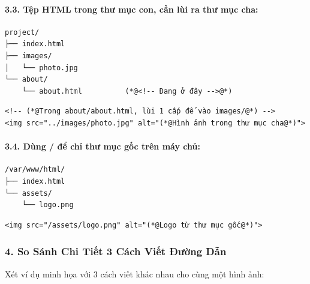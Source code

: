 \documentclass[11pt,oneside]{book}
\begin{document}
\paragraph{3.3. Tệp HTML trong thư mục con, cần lùi ra thư mục cha:}

\begin{codeWindow}
\begin{lstlisting}[language=HTML5]
project/
├── index.html
├── images/
│   └── photo.jpg
└── about/
    └── about.html          (*@<!-- Đang ở đây -->@*)
\end{lstlisting}
\end{codeWindow}

\begin{codeWindow}
\begin{lstlisting}[language=HTML5]
<!-- (*@Trong about/about.html, lùi 1 cấp để vào images/@*) -->
<img src="../images/photo.jpg" alt="(*@Hình ảnh trong thư mục cha@*)">
\end{lstlisting}
\end{codeWindow}

\paragraph{3.4. Dùng / để chỉ thư mục gốc trên máy chủ:}

\begin{codeWindow}
\begin{lstlisting}[language=HTML5]
/var/www/html/
├── index.html
└── assets/
    └── logo.png
\end{lstlisting}
\end{codeWindow}

\begin{codeWindow}
\begin{lstlisting}[language=HTML5]
<img src="/assets/logo.png" alt="(*@Logo từ thư mục gốc@*)">
\end{lstlisting}
\end{codeWindow}

\subsubsection{4. So Sánh Chi Tiết 3 Cách Viết Đường Dẫn}

Xét ví dụ minh họa với 3 cách viết khác nhau cho cùng một hình ảnh:
\end{document}
